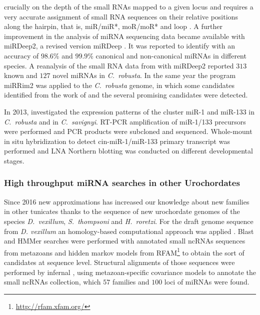 \documentclass[graybox]{svmult}
\begin{document}
crucially on the depth of the small RNAs mapped to a given locus and
requires a very accurate assignment of small RNA sequences on their
relative positions along the hairpin, that is, miR/miR*, moR/moR* and loop
\cite{Hendrix2010}. A further improvement in the analysis of miRNA
sequencing data became available with miRDeep2, a revised version miRDeep
\cite{Friedlaender:12}.  It was reported to identify with an accuracy of
$98.6$\% and $99.9$\% canonical and non-canonical miRNAs in different
species. A reanalysis of the small RNA data from \cite{Shi2009} with
miRDeep2 reported $313$ known and $127$ novel miRNAs in \textit{C.\
  robusta}. In the same year the program miRRim2 \cite{Terai2012} was
applied to the \textit{C.\ robusta} genome, in which some candidates
identified from the work of \cite{Hendrix2010} and the several promising
candidates were detected.

In 2013, \cite{Kusakabe2013} investigated the expression patterns of the
cluster miR-1 and miR-133 in \textit{C.\ robusta} and in \textit{C.\
  savignyi}. RT-PCR amplification of miR-1/133 precursors were performed
and PCR products were subcloned and sequenced. Whole-mount in situ
hybridization to detect cin-miR-1/miR-133 primary transcript was performed
and LNA Northern blotting was conducted on different developmental stages.

\subsubsection{High throughput miRNA searches in other Urochordates}

Since 2016 new approximations has increased our knowledge about new
families in other tunicates thanks to the sequence of new urochordate
genomes of the species \textit{D.\ vexillum}, \textit{S.\ thompsoni} and
\textit{H.\ roretzi}. For the draft genome sequence from
\textit{D. vexillum} an homology-based computational approach was applied
\cite{Velandia-Huerto2016}.  Blast and HMMer searches were performed with
annotated small ncRNAs sequences from metazoans and hidden markov models
from RFAM\footnote{\url{http://rfam.xfam.org/}} to obtain the sort of
candidates at sequence level. Structural alignments of those sequences were
performed by infernal \cite{Nawrocki:2013}, using metazoan-specific
covariance models to annotate the small ncRNAs collection, which $57$
families and $100$ loci of miRNAs were found.
\end{document}
